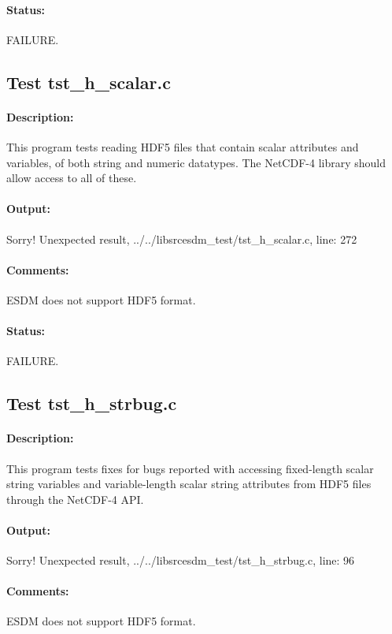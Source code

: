 \paragraph{Status:} FAILURE.

\subsection{Test tst\_h\_scalar.c}

\paragraph{Description:} This program tests reading HDF5 files that contain scalar attributes and variables, of both string and numeric datatypes. The NetCDF-4 library should allow access to all of these.

\paragraph{Output:} Sorry! Unexpected result, ../../libsrcesdm\_test/tst\_h\_scalar.c, line: 272

\paragraph{Comments:} ESDM does not support HDF5 format.

\paragraph{Status:} FAILURE.

\subsection{Test tst\_h\_strbug.c}

\paragraph{Description:} This program tests fixes for bugs reported with accessing fixed-length scalar string variables and variable-length scalar string attributes from HDF5 files through the NetCDF-4 API.

\paragraph{Output:} Sorry! Unexpected result, ../../libsrcesdm\_test/tst\_h\_strbug.c, line: 96

\paragraph{Comments:} ESDM does not support HDF5 format.

